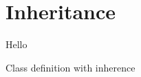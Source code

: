 \chapter{Inheritance}

Hello

\begin{syntaxfloat}
  
  \caption{Class definition with inherence}
  \label{syntax:inheritance:class}
\end{syntaxfloat}


